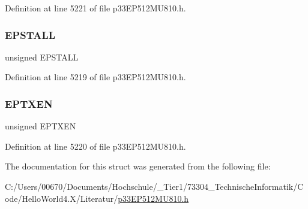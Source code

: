 Definition at line 5221 of file p33\+E\+P512\+M\+U810.\+h.

\mbox{\label{structtag_u1_e_p11_b_i_t_s_a47042104f04ebe06a23f9789bd400d7e}} 
\subsubsection{\texorpdfstring{E\+P\+S\+T\+A\+LL}{EPSTALL}}
{\footnotesize\ttfamily unsigned E\+P\+S\+T\+A\+LL}



Definition at line 5219 of file p33\+E\+P512\+M\+U810.\+h.

\mbox{\label{structtag_u1_e_p11_b_i_t_s_aa2d88c1be513e759c136823c86a355b4}} 
\subsubsection{\texorpdfstring{E\+P\+T\+X\+EN}{EPTXEN}}
{\footnotesize\ttfamily unsigned E\+P\+T\+X\+EN}



Definition at line 5220 of file p33\+E\+P512\+M\+U810.\+h.



The documentation for this struct was generated from the following file\+:\begin{DoxyCompactItemize}
\item 
C\+:/\+Users/00670/\+Documents/\+Hochschule/\+\_\+\+Tier1/73304\+\_\+\+Technische\+Informatik/\+Code/\+Hello\+World4.\+X/\+Literatur/\hyperlink{p33_e_p512_m_u810_8h}{p33\+E\+P512\+M\+U810.\+h}\end{DoxyCompactItemize}
